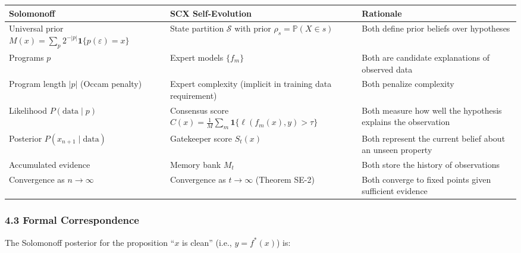 \documentclass[
  12pt,
]{article}
\begin{document}
\begin{longtable}[]{@{}
  >{\raggedright\arraybackslash}p{}
  >{\raggedright\arraybackslash}p{}
  >{\raggedright\arraybackslash}p{}@{}}
\toprule\noalign{}
\begin{minipage}[b]{\linewidth}\raggedright
Solomonoff
\end{minipage} & \begin{minipage}[b]{\linewidth}\raggedright
SCX Self-Evolution
\end{minipage} & \begin{minipage}[b]{\linewidth}\raggedright
Rationale
\end{minipage} \\
\midrule\noalign{}
\endhead
\bottomrule\noalign{}
\endlastfoot
Universal prior
\(M(x) = \sum_p 2^{-|p|}\mathbf{1}\{p(\varepsilon) = x\}\) & State
partition \(\mathcal{S}\) with prior \(\rho_s = \mathbb{P}(X \in s)\) &
Both define prior beliefs over hypotheses \\
Programs \(p\) & Expert models \(\{f_m\}\) & Both are candidate
explanations of observed data \\
Program length \(|p|\) (Occam penalty) & Expert complexity (implicit in
training data requirement) & Both penalize complexity \\
Likelihood \(P(\text{data} \mid p)\) & Consensus score
\(C(x) = \frac{1}{M}\sum_m \mathbf{1}\{\ell(f_m(x), y) > \tau\}\) & Both
measure how well the hypothesis explains the observation \\
Posterior \(P(x_{n+1} \mid \text{data})\) & Gatekeeper score \(S_t(x)\)
& Both represent the current belief about an unseen property \\
Accumulated evidence & Memory bank \(M_t\) & Both store the history of
observations \\
Convergence as \(n \to \infty\) & Convergence as \(t \to \infty\)
(Theorem SE-2) & Both converge to fixed points given sufficient
evidence \\
\end{longtable}

\subsubsection{4.3 Formal Correspondence}\label{formal-correspondence}

The Solomonoff posterior for the proposition ``\(x\) is clean'' (i.e.,
\(y = f^*(x)\)) is:
\end{document}
